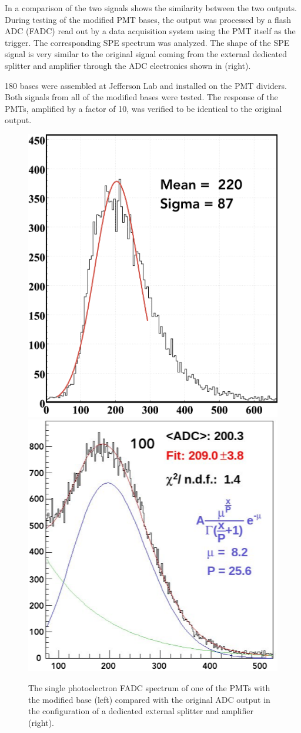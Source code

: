In  a comparison of the two signals shows the similarity between the two outputs. During testing of the
modified PMT bases, the output was processed by a flash ADC (FADC) read out by a data acquisition system using the PMT
itself as the trigger. The corresponding SPE spectrum was analyzed. The shape of the SPE signal is very similar to the
original signal coming from the external dedicated splitter and amplifier through the ADC electronics shown in
 (right).

180 bases were assembled at Jefferson Lab and installed on the PMT dividers. Both signals from all of the modified
bases were tested. The response of the PMTs, amplified by a factor of 10, was verified to be identical to the original
output.

\begin{figure}
	\centering
	\includegraphics[width=0.47\columnwidth,height=0.75\columnwidth]{img/fadcOutput.png}
	\includegraphics[width=0.47\columnwidth,height=0.75\columnwidth]{img/cc_signal.png}
	\caption{The single photoelectron FADC spectrum of one of the PMTs with the modified base (left) compared with
          the original ADC output in the configuration of a dedicated external splitter and amplifier (right). }
	\label{fig:dividerTests}
\end{figure}



